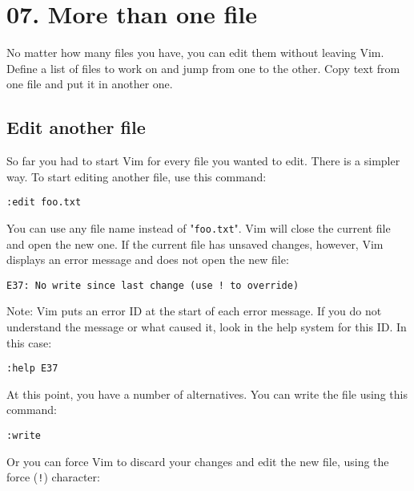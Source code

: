 \section{07. More than one file}
No matter how many files you have, you can edit them without leaving Vim.
Define a list of files to work on and jump from one to the other.
Copy text from one file and put it in another one.
\localtableofcontents
\subsection{Edit another file}

So far you had to start Vim for every file you wanted to edit.
There is a simpler way.
To start editing another file, use this command:

 \begin{Verbatim}[samepage=true]
 :edit foo.txt
 \end{Verbatim}

You can use any file name instead of "\texttt{foo.txt}".
Vim will close the current file and open the new one.
If the current file has unsaved changes, however, Vim displays an error message and does not open the new file:

\begin{Verbatim}[samepage=true]
  E37: No write since last change (use ! to override) 
\end{Verbatim}

Note:
Vim puts an error ID at the start of each error message.
If you do not understand the message or what caused it, look in the help system for this ID.
In this case:

\begin{Verbatim}[samepage=true]
  :help E37
\end{Verbatim}

At this point, you have a number of alternatives.
You can write the file using this command:

 \begin{Verbatim}[samepage=true]
 :write
 \end{Verbatim}

 Or you can force Vim to discard your changes and edit the new file, using the force (\texttt{!}) character:

